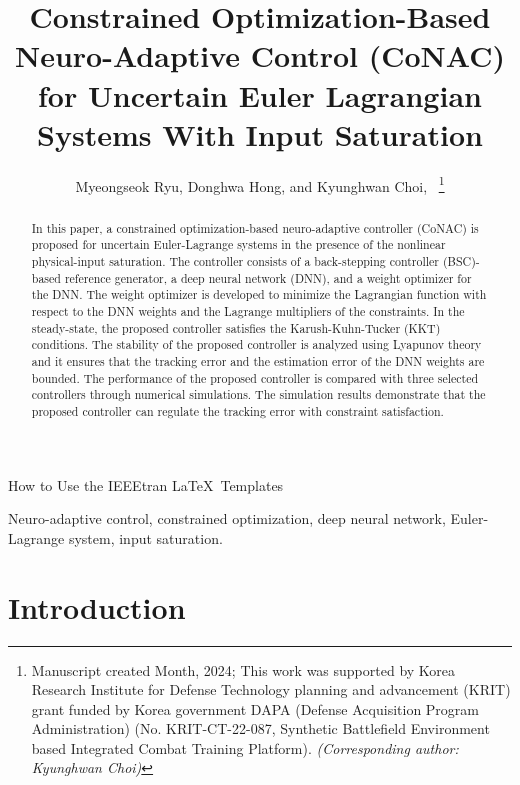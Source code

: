\documentclass[lettersize,journal]{IEEEtran}
\begin{document}
\title{
Constrained Optimization-Based Neuro-Adaptive Control (CoNAC) for Uncertain Euler Lagrangian Systems With Input Saturation
}
\author{Myeongseok Ryu, Donghwa Hong, and Kyunghwan Choi,~
\thanks{Manuscript created Month, 2024; This work was supported by Korea Research Institute for Defense Technology planning and advancement (KRIT) grant funded by Korea government DAPA (Defense Acquisition Program Administration) (No. KRIT-CT-22-087, Synthetic Battlefield Environment based Integrated Combat Training Platform). \it{(Corresponding author: Kyunghwan Choi)}}}

%
{How to Use the IEEEtran \LaTeX \ Templates}

\maketitle

\begin{abstract}
    In this paper, a constrained optimization-based neuro-adaptive controller (CoNAC) is proposed for uncertain Euler-Lagrange systems in the presence of the nonlinear physical-input saturation. 
    The controller consists of a back-stepping controller (BSC)-based reference generator, a deep neural network (DNN), and a weight optimizer for the DNN.
    The weight optimizer is developed to minimize the Lagrangian function with respect to the DNN weights and the Lagrange multipliers of the constraints.
    In the steady-state, the proposed controller satisfies the Karush-Kuhn-Tucker (KKT) conditions.
    The stability of the proposed controller is analyzed using Lyapunov theory and it ensures that the tracking error and the estimation error of the DNN weights are bounded. 
    The performance of the proposed controller is compared with three selected controllers through numerical simulations. 
    The simulation results demonstrate that the proposed controller can regulate the tracking error with constraint satisfaction.
\end{abstract}

\begin{IEEEkeywords}
Neuro-adaptive control, constrained optimization, deep neural network, Euler-Lagrange system, input saturation.
\end{IEEEkeywords}

\section{Introduction}
\end{document}
